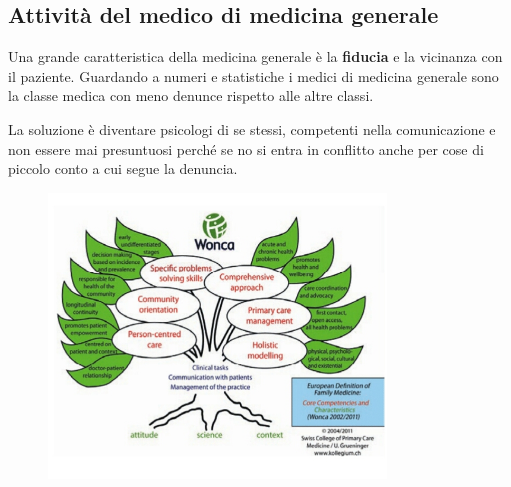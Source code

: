 \subsection{Attività del medico di medicina generale}

Una grande caratteristica della medicina generale è la \textbf{fiducia}
e la vicinanza con il paziente. Guardando a numeri e statistiche i
medici di medicina generale sono la classe medica con meno denunce
rispetto alle altre classi.

La soluzione è diventare psicologi di se stessi, competenti nella
comunicazione e non essere mai presuntuosi perché se no si entra in
conflitto anche per cose di piccolo conto a cui segue la denuncia.

\begin{figure}[!ht]
\centering
	\includegraphics[width=0.8\textwidth]{39/image1.jpeg}
	\end{figure}
	
